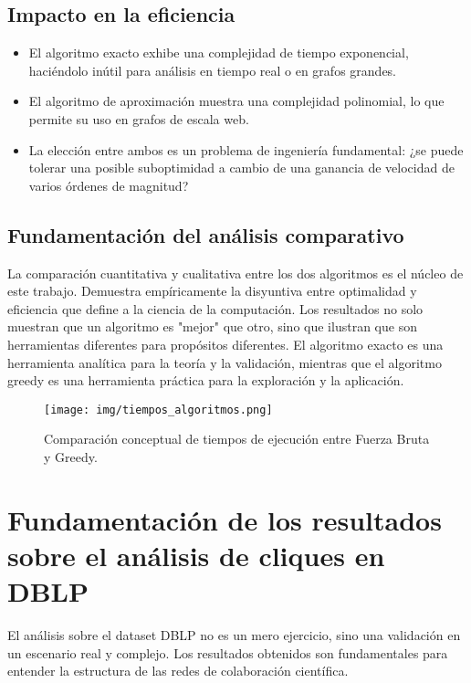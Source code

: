 \documentclass[12pt,a4paper]{report}
\begin{document}
\subsection{Impacto en la eficiencia}
\begin{itemize}
    \item El algoritmo exacto exhibe una complejidad de tiempo exponencial, haciéndolo inútil para análisis en tiempo real o en grafos grandes.
    \item El algoritmo de aproximación muestra una complejidad polinomial, lo que permite su uso en grafos de escala web.
    \item La elección entre ambos es un problema de ingeniería fundamental: ¿se puede tolerar una posible suboptimidad a cambio de una ganancia de velocidad de varios órdenes de magnitud?
\end{itemize}

\subsection{Fundamentación del análisis comparativo}
La comparación cuantitativa y cualitativa entre los dos algoritmos es el núcleo de este trabajo. Demuestra empíricamente la disyuntiva entre optimalidad y eficiencia que define a la ciencia de la computación. Los resultados no solo muestran que un algoritmo es "mejor" que otro, sino que ilustran que son herramientas diferentes para propósitos diferentes. El algoritmo exacto es una herramienta analítica para la teoría y la validación, mientras que el algoritmo greedy es una herramienta práctica para la exploración y la aplicación.

\begin{figure}[H]
    \centering
    \texttt{[image: img/tiempos\_algoritmos.png]}
    \caption{Comparación conceptual de tiempos de ejecución entre Fuerza Bruta y Greedy.}
    \label{fig:tiempos_ejecucion}
\end{figure}

\section{Fundamentación de los resultados sobre el análisis de cliques en DBLP}

El análisis sobre el dataset DBLP no es un mero ejercicio, sino una validación en un escenario real y complejo. Los resultados obtenidos son fundamentales para entender la estructura de las redes de colaboración científica.
\end{document}
